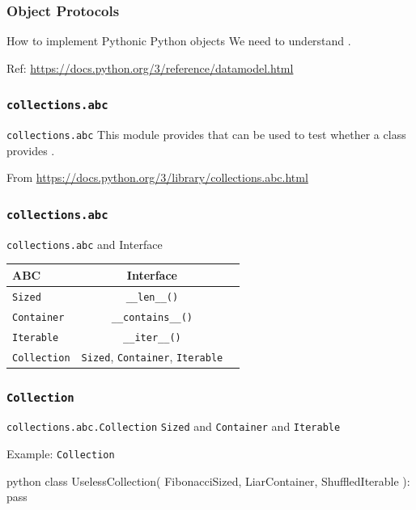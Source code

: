 \documentclass[aspectratio=169,dvipdfmx,12pt,notheorems]{beamer}
\theoremstyle{definition}
\begin{document}
\begin{frame}\frametitle{Object Protocols}

\begin{block}{How to implement Pythonic Python objects}
We need to understand .
\end{block}
Ref: \url{https://docs.python.org/3/reference/datamodel.html}

\end{frame}

\begin{frame}\frametitle{\texttt{collections.abc}}

\begin{block}{\texttt{collections.abc}}
This module provides  that can be used to test whether a class provides .
\end{block}
From \url{https://docs.python.org/3/library/collections.abc.html}

\end{frame}

\begin{frame}\frametitle{\texttt{collections.abc}}

\begin{exampleblock}{\texttt{collections.abc} and Interface}
\begin{table}[h]
\centering
\begin{tabular}{lcr}
\hline
ABC  & Interface \\
\hline
\texttt{Sized}  & \texttt{\_\_len\_\_()} \\
\texttt{Container}  & \texttt{\_\_contains\_\_()} \\
\texttt{Iterable}  &  \texttt{\_\_iter\_\_()} \\
\texttt{Collection}  & \texttt{Sized}, \texttt{Container}, \texttt{Iterable}  \\
\hline
\end{tabular}
\end{table}
\end{exampleblock}

\end{frame}

\begin{frame}[fragile]\frametitle{\texttt{Collection}}

\begin{block}{\texttt{collections.abc.Collection}}
\texttt{Sized} and \texttt{Container} and \texttt{Iterable}
\end{block}

\begin{exampleblock}{Example: \texttt{Collection}}
\begin{pygments}{python}
class UselessCollection(
    FibonacciSized, LiarContainer, ShuffledIterable
):
    pass
\end{pygments}
\end{exampleblock}

\end{frame}
\end{document}
